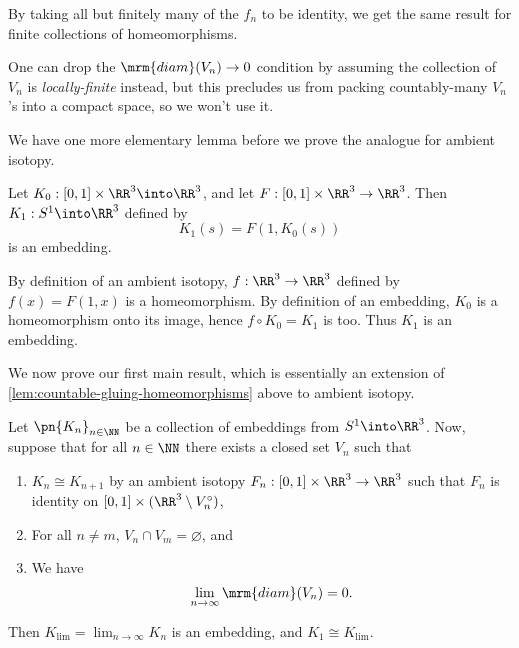 \begin{remark}
  By taking all but finitely many of the $f_n$ to be identity, we get
  the same result for finite collections of homeomorphisms.
\end{remark}
\begin{remark}
  One can drop the $\mrm{diam}(V_n) \to 0$ condition by assuming the
  collection of $V_n$ is \emph{locally-finite} instead, but this
  precludes us from packing countably-many $V_n$'s into a compact
  space, so we won't use it.
\end{remark}

We have one more elementary lemma before we prove the analogue for
ambient isotopy.
\begin{lemma}\label{lem:endpoints-of-ambient-isotopies-are-embeddings}
  Let $K_0 : [0,1] \times \RR^3 \into \RR^3$, and let $F : [0,1]
  \times \RR^3 \to \RR^3$. Then $K_1 : S^1\into \RR^3$ defined by
  \[
    K_1(s) = F(1, K_0(s))
  \]
  is an embedding.
\end{lemma}
\begin{sproof}
  By definition of an ambient isotopy, $f : \RR^3 \to \RR^3$ defined
  by $f(x) = F(1, x)$ is a homeomorphism. By definition of an
  embedding, $K_0$ is a homeomorphism onto its image, hence $f \circ
  K_0 = K_1$ is too. Thus $K_1$ is an embedding.
\end{sproof}
We now prove our first main result, which is essentially an extension
of \cref{lem:countable-gluing-homeomorphisms} above to ambient
isotopy.
\begin{theorem}\label{thm:countable-gluing-ambient-isotopies}
  Let $\pn{K_n}_{n\in\NN}$ be a collection of embeddings from
  $S^1\into \RR^3$. Now, suppose that for all $n \in\NN$ there exists
  a closed set $V_n$ such that
  \begin{enumerate}
    \item $K_n \cong K_{n+1}$ by an ambient isotopy $F_n : [0,1]
      \times \RR^3 \to \RR^3$ such that $F_n$ is identity on $[0,1]
      \times (\RR^3 \setminus V_n^\circ)$,
    \item For all $n \neq m$, $V_n \cap V_m = \varnothing$, and
    \item We have
      \[
      \lim_{n\to\infty} \mrm{diam}(V_n) = 0.
      \]
  \end{enumerate}
  Then $K_{\lim} = \lim_{n\to\infty} K_n$ is an embedding, and $K_1
  \cong K_{\lim}$.
\end{theorem}
